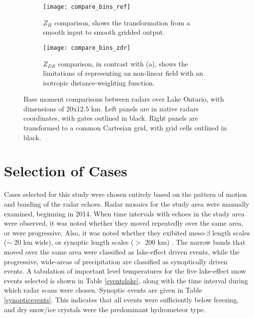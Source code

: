 \begin{figure}[t!]
\centering
   \begin{subfigure}{1.0\textwidth} \centering
     \texttt{[image: compare\_bins\_ref]}
     \caption{$Z_H$ comparison, shows the transformation from a smooth input to smooth gridded output.}\label{fig:compare_ref}
   \end{subfigure}
   \begin{subfigure}{1.0\textwidth} \centering
     \texttt{[image: compare\_bins\_zdr]}
     \caption{$Z_{DR}$ comparison, in contrast with (a), shows the limitations of representing an non-linear field with an isotropic distance-weighting
     function. }\label{fig:compare_zdr}
   \end{subfigure}
\caption{Base moment comparisons between radars over Lake Ontario, with dimensions of 20x12.5 km. Left panels are in native radars coordinates, with gates
outlined in black. Right panels are transformed to a common Cartesian grid, with grid cells outlined in black.} \label{fig:compare_bins}
\end{figure}

\section{Selection of Cases}
Cases selected for this study were chosen entirely based on the pattern of motion and banding of the radar
echoes. Radar mosaics for the study area were
manually examined, beginning in 2014. When time intervals with echoes in the study area were observed, it was
noted whether they moved repeatedly over the same area,
or were progressive.  Also, it was noted whether they exibited meso-$\beta$ length scales ($\sim$ 20 km wide),
or synoptic length scales ($>$ 200 km) \citep{Orlanski1975}. The narrow bands that moved over the same area
were classified as lake-effect driven events, while the progressive, wide-areas of precipitation are classified as
synoptically driven events. A tabulation of important level temperatures for the five lake-effect snow events selected
is shown in Table \ref{eventslake}, along with the time interval during which radar scans were chosen. Synoptic
events are given in Table \ref{synopticevents}. This indicates that all events were sufficiently below freezing, and
dry snow/ice crystals were the predominant hydrometeor type.

